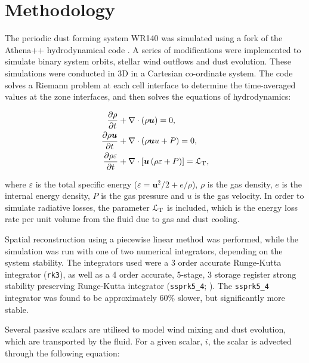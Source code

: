 \section{Methodology}
\label{sec:paper-2-methodology}

The periodic dust forming system WR140 was simulated using a fork of the Athena++ hydrodynamical code \parencite{stoneAthenaAdaptiveMesh2020}.
A series of modifications were implemented to simulate binary system orbits, stellar wind outflows and dust evolution.
These simulations were conducted in 3D in a Cartesian co-ordinate system.
The code solves a Riemann problem at each cell interface to determine the time-averaged values at the zone interfaces, and then solves the equations of hydrodynamics:

\begin{subequations}
  \begin{align}
    \frac{\partial\rho}{\partial t} & +\nabla \cdot \left(\rho \boldsymbol{u}\right) = 0 , \\
    \frac{\partial \rho \boldsymbol{u}}{\partial t} & + \nabla \cdot \left(\rho \boldsymbol{u} u + P \right) = 0, \\
    \frac{\partial \rho \varepsilon}{\partial t} & + \nabla \cdot \left[ \boldsymbol{u} \left( \rho\varepsilon + P \right) \right] = \mathcal{L}_\text{T} , 
  \end{align}
\end{subequations}

\noindent
where $\varepsilon$ is the total specific energy ($\varepsilon = \boldsymbol{u}^2/2 + e/\rho $), $\rho$ is the gas density, $e$ is the internal energy density, $P$ is the gas pressure and $u$ is the gas velocity.
In order to simulate radiative losses, the parameter $\mathcal{L}_\text{T}$ is included, which is the energy loss rate per unit volume from the fluid due to gas and dust cooling.

Spatial reconstruction using a piecewise linear method was performed, while the simulation was run with one of two numerical integrators, depending on the system stability.
The integrators used were a 3 order accurate Runge-Kutta integrator (\texttt{rk3}), as well as a 4 order accurate, 5-stage, 3 storage register strong stability preserving Runge-Kutta integrator (\texttt{ssprk5\_4}; \textcite{ruuthHighOrderStrongStabilityPreservingRungeKutta2005}).
The \texttt{ssprk5\_4} integrator was found to be approximately 60\% slower, but significantly more stable.

Several passive scalars are utilised to model wind mixing and dust evolution, which are transported by the fluid.
For a given scalar, $i$, the scalar is advected through the following equation:

